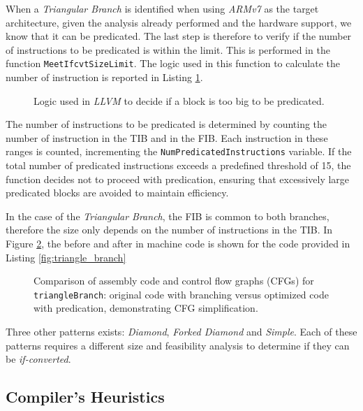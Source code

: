When a \textit{Triangular Branch} is identified when using \textit{ARMv7} as the target architecture, given the analysis already performed and the hardware support, we know that it can be predicated. The last step is therefore to verify if the number of instructions to be predicated is within the limit. This is performed in the function \texttt{MeetIfcvtSizeLimit}. The logic used in this function to calculate the number of instruction is reported in Listing \ref{fig:predication_size}.

\begin{figure}[H]
    \centering
    
    \caption{Logic used in \textit{LLVM} to decide if a block is too big to be predicated.}
    \label{fig:predication_size}
\end{figure}

The number of instructions to be predicated is determined by counting the number of instruction in the TIB and in the FIB. Each instruction in these ranges is counted, incrementing the \texttt{NumPredicatedInstructions} variable. If the total number of predicated instructions exceeds a predefined threshold of 15, the function decides not to proceed with predication, ensuring that excessively large predicated blocks are avoided to maintain efficiency.

In the case of the \textit{Triangular Branch}, the FIB is common to both branches, therefore the size only depends on the number of instructions in the TIB. In Figure \ref{fig:triangle_asm}, the before and after in machine code is shown for the code provided in Listing \ref{fig:triangle_branch}

\begin{figure}[H]
    \centering
    
    \caption{Comparison of assembly code and control flow graphs (CFGs) for \texttt{triangleBranch}: original code with branching versus optimized code with predication, demonstrating CFG simplification.}
    \label{fig:triangle_asm}
\end{figure}


Three other patterns exists: \textit{Diamond}, \textit{Forked Diamond} and \textit{Simple}. Each of these patterns requires a different size and feasibility analysis to determine if they can be \textit{if-converted}.

\subsection{Compiler's Heuristics}
\label{sec:compiler_heuristics}

